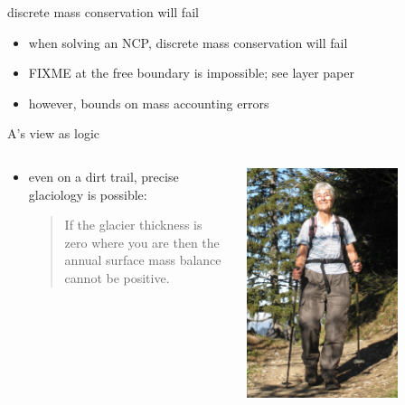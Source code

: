 \documentclass[10pt,hyperref,dvipsnames]{beamer}
\begin{document}
\begin{frame}{discrete mass conservation will fail}
\begin{itemize}
\item when solving an NCP, discrete mass conservation will fail
\item FIXME at the free boundary is impossible; see layer paper
\item however, bounds on mass accounting errors
\end{itemize}
\end{frame}


\begin{frame}{A's view as logic}

\begin{columns}
\begin{column}{0.8\textwidth}
\begin{itemize}
\item even on a dirt trail, precise glaciology is possible:

\bigskip
\begin{quote}
If the glacier thickness is zero where you are then the annual surface mass balance cannot be positive.
\end{quote}
\end{itemize}
\end{column}
\begin{column}{0.2\textwidth}
\hfill \includegraphics[width=0.7\textwidth]{figs/Iken_front_crop.jpg} \hfill
\end{column}
\end{columns}


\end{frame}
\end{document}
